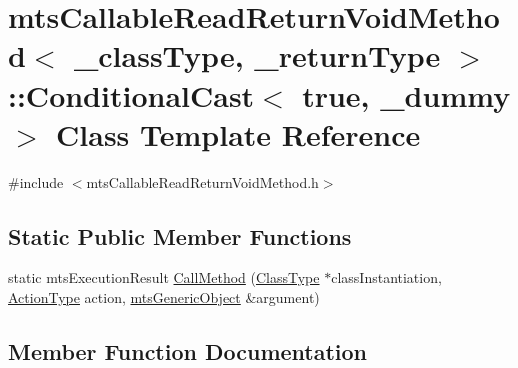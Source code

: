 \hypertarget{classmts_callable_read_return_void_method_1_1_conditional_cast_3_01true_00_01__dummy_01_4}{}\section{mts\+Callable\+Read\+Return\+Void\+Method$<$ \+\_\+class\+Type, \+\_\+return\+Type $>$\+:\+:Conditional\+Cast$<$ true, \+\_\+dummy $>$ Class Template Reference}
\label{classmts_callable_read_return_void_method_1_1_conditional_cast_3_01true_00_01__dummy_01_4}


{\ttfamily \#include $<$mts\+Callable\+Read\+Return\+Void\+Method.\+h$>$}

\subsection*{Static Public Member Functions}
\begin{DoxyCompactItemize}
\item 
static mts\+Execution\+Result \hyperlink{classmts_callable_read_return_void_method_1_1_conditional_cast_3_01true_00_01__dummy_01_4_ad25d200a48d40f9eeece2798b1435c54}{Call\+Method} (\hyperlink{classmts_callable_read_return_void_method_a694e26a4c7fc28f0c739aa2f2ab97e12}{Class\+Type} $\ast$class\+Instantiation, \hyperlink{classmts_callable_read_return_void_method_a97673cc9242251e406bde738cb060781}{Action\+Type} action, \hyperlink{classmts_generic_object}{mts\+Generic\+Object} \&argument)
\end{DoxyCompactItemize}


\subsection{Member Function Documentation}
\hypertarget{classmts_callable_read_return_void_method_1_1_conditional_cast_3_01true_00_01__dummy_01_4_ad25d200a48d40f9eeece2798b1435c54}{}
